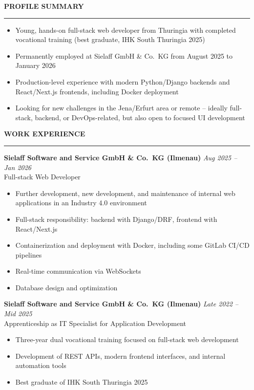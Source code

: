 \documentclass[a4paper, 11pt]{article}
\newcommand{\cvsection}[1]{%
  \vspace{0.4cm}%
  {\large\bfseries\MakeUppercase{#1}}\\[-0.1cm]%
  \rule{\linewidth}{0.4pt}%
  \vspace{0.15cm}%
}
\begin{document}
\hfill
\begin{minipage}[t]{0.52\textwidth}
\vspace{0pt}

\cvsection{Profile Summary}
\begin{itemize}
  \item Young, hands-on full-stack web developer from Thuringia with completed vocational training (best graduate, IHK South Thuringia 2025)
  \item Permanently employed at Sielaff GmbH \& Co.\ KG from August 2025 to January 2026
  \item Production-level experience with modern Python/Django backends and React/Next.js frontends, including Docker deployment
  \item Looking for new challenges in the Jena/Erfurt area or remote -- ideally full-stack, backend, or DevOps-related, but also open to focused UI development
\end{itemize}

\cvsection{Work Experience}

\textbf{Sielaff Software and Service GmbH \& Co.\ KG (Ilmenau)}
\hfill \textit{Aug 2025 -- Jan 2026}\\
Full-stack Web Developer
\begin{itemize}
  \item Further development, new development, and maintenance of internal web applications in an Industry 4.0 environment
  \item Full-stack responsibility: backend with Django/DRF, frontend with React/Next.js
  \item Containerization and deployment with Docker, including some GitLab CI/CD pipelines
  \item Real-time communication via WebSockets
  \item Database design and optimization
\end{itemize}

\vspace{0.35cm}

\textbf{Sielaff Software and Service GmbH \& Co.\ KG (Ilmenau)}
\hfill \textit{Late 2022 -- Mid 2025}\\
Apprenticeship as IT Specialist for Application Development
\begin{itemize}
  \item Three-year dual vocational training focused on full-stack web development
  \item Development of REST APIs, modern frontend interfaces, and internal automation tools
  \item Best graduate of IHK South Thuringia 2025
\end{itemize}

\end{minipage}
\end{document}
